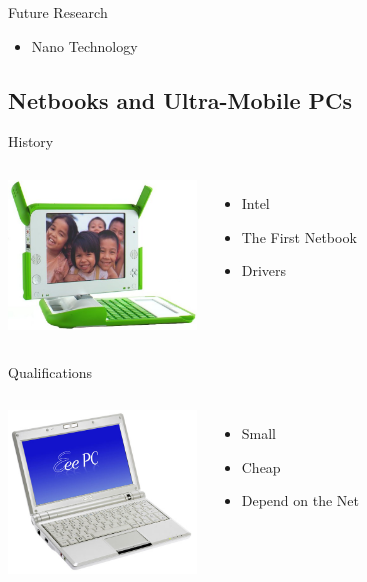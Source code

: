 \documentclass{beamer}
\begin{document}
\begin{frame}{Future Research}
  \begin{itemize}
  \item Nano Technology
  \end{itemize}
\end{frame}

\subsection{Netbooks and Ultra-Mobile PCs}

\begin{frame}{History}
  \begin{columns}
    \column{5cm}
    \includegraphics[width=5cm]{olpc.jpg}
    \column{5cm}
    \begin{itemize}
    \item Intel %
    \item The First Netbook
    \item Drivers
    \end{itemize}
  \end{columns}
\end{frame}

\begin{frame}{Qualifications}
  \begin{columns}
    \column{5cm}
    \includegraphics[width=5cm]{netbookSpecs.jpg}
    \column{5cm}
    \begin{itemize}
    \item Small
    \item Cheap
    \item Depend on the Net
    \end{itemize}
  \end{columns}
\end{frame}
\end{document}
